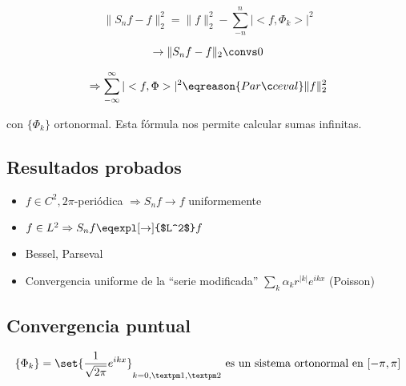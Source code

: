 		\begin{corol}

		\[ \| S_n f - f \|_2^2 = \|f\|_2^2 - \sum_{-n}^{n} |<f, \Phi_k>|^2\]

		\[\rightarrow \|S_n f - f \|_2 \convs 0 \]

		\[\Rightarrow  \sum_{-\infty}^{\infty} | <f, \Phi>|^2 \eqreason{Parçeval} \|f\|_2^2 \]

		con $\{\Phi_k\}$ ortonormal. Esta fórmula nos permite calcular sumas infinitas.

		\end{corol}


	\subsection{Resultados probados}


		\begin{itemize}

			\item $f \in C^2, 2\pi$-periódica $\Rightarrow S_n f \rightarrow f$ uniformemente

			\item $f\in L^2 \Rightarrow S_n f \eqexpl[\rightarrow]{$L^2$} f$

			\item Bessel, Parseval

			\item Convergencia uniforme de la ``serie modificada'' $\sum\limits_k \alpha_k r^{|k|} e^{ikx}$ (Poisson)

		\end{itemize}


	\subsection{Convergencia puntual}

	\begin{theorem}

		\[ \{\Phi_k\} = \set{\frac{1}{\sqrt{2\pi}} e^{ikx}}_{k=0, ±1,±2}  \text{ es  un sistema ortonormal en } [-\pi,\pi]\]

	\end{theorem}

